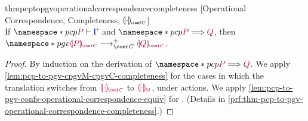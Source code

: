 \documentclass[main.tex]{subfiles}
\begin{document}
\begin{restatabletheorem}{thmpcptopgvoperationalcorrespondencecompleteness}%
  [Operational Correspondence, Completeness, $\cpgvC{\cdot}$]
  \label{thm:pcp-to-pgv-operational-correspondence-completeness}
  \hfill\\%
  If $\pcp{\seq{P}{\ty{\Gamma}}}$ and $\pcp{\tm{P}\red\tm{Q}}$,
  then $\pgv{\tm{\cpgvC{P}}\cred^+\tm{\cpgvC{Q}}}$.
\end{restatabletheorem}
\begin{proof}
  By induction on the derivation of $\pcp{\tm{P}\red\tm{Q}}$.
  We apply \cref{lem:pcp-to-pgv-cpgvM-cpgvC-completeness} for the cases in which
  the translation switches from $\tm{\cpgvC{\cdot}}$ to $\tm{\cpgvM{\cdot}}$,
  \ie under actions.
  We apply \cref{lem:pcp-to-pgv-confs-operational-correspondence-equiv} for
  . 
  (Details in \cref{prf:thm-pcp-to-pgv-operational-correspondence-completeness}.)
\end{proof}
\end{document}
